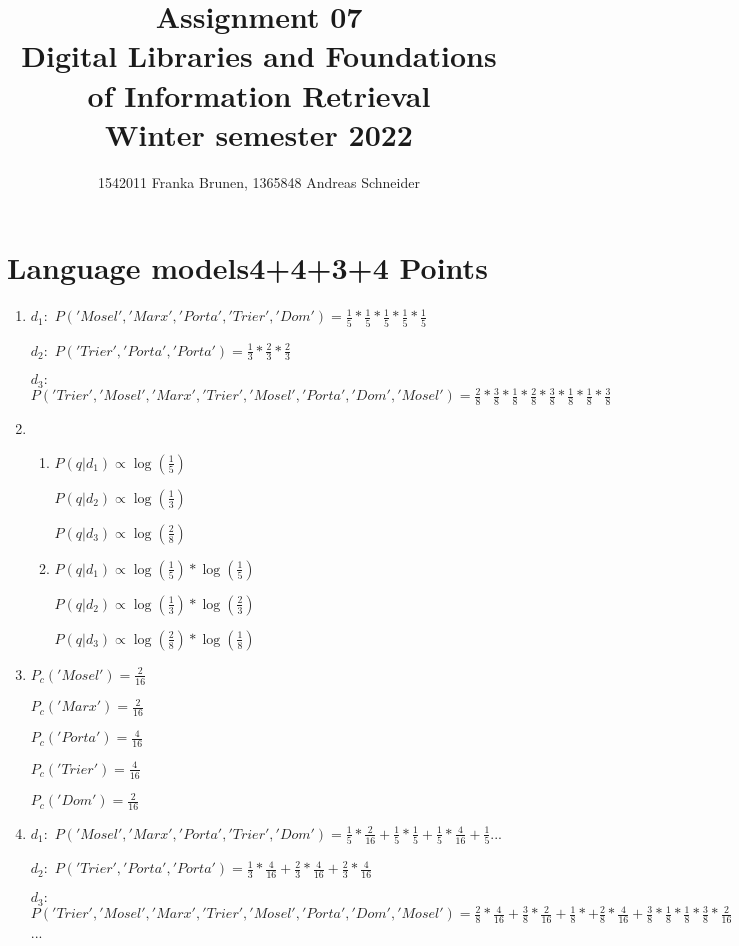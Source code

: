 \documentclass[10pt,a4paper]{article}
\title{ \vspace{-3em}
        Assignment 07\\
		\small{\bf Digital Libraries and Foundations of Information Retrieval}\\
		\small{Winter semester 2022}}
\author{\small{1542011 Franka Brunen}, \small{1365848 Andreas Schneider}}
\date{}
\begin{document}
\setlength{\parskip}{6pt} %
\setlength{\parindent}{0pt}

\leftskip=1cm\rightskip=0.5cm %

\maketitle

\section{\hfill Language models\hfill 4+4+3+4 Points}
\begin{enumerate}
    \item $d_1:$ $P('Mosel', 'Marx', 'Porta', 'Trier', 'Dom') = \frac{1}{5} * \frac{1}{5} * \frac{1}{5} * \frac{1}{5} * \frac{1}{5}$
    
    $d_2:$ $P('Trier', 'Porta', 'Porta') = \frac{1}{3} * \frac{2}{3} * \frac{2}{3}$
    
    $d_3:$ $P('Trier', 'Mosel', 'Marx', 'Trier', 'Mosel', 'Porta', 'Dom', 'Mosel') = \frac{2}{8} * \frac{3}{8} * \frac{1}{8} * \frac{2}{8} * \frac{3}{8} * \frac{1}{8} * \frac{1}{8} * \frac{3}{8}$
    \item \begin{enumerate}
        \item $P(q|d_1) \propto \log(\frac{1}{5})$
        
        $P(q|d_2) \propto \log(\frac{1}{3})$
        
        $P(q|d_3) \propto \log(\frac{2}{8})$
        \item $P(q|d_1) \propto \log(\frac{1}{5}) * \log(\frac{1}{5})$
        
        $P(q|d_2) \propto \log(\frac{1}{3}) * \log(\frac{2}{3})$
        
        $P(q|d_3) \propto \log(\frac{2}{8}) * \log(\frac{1}{8})$
    \end{enumerate}
    \item $P_c('Mosel') = \frac{2}{16}$
    
    $P_c('Marx') = \frac{2}{16}$
    
    $P_c('Porta') = \frac{4}{16}$
    
    $P_c('Trier') = \frac{4}{16}$
    
    $P_c('Dom') = \frac{2}{16}$
    \item $d_1:$ $P('Mosel', 'Marx', 'Porta', 'Trier', 'Dom') = \frac{1}{5} * \frac{2}{16} + \frac{1}{5} * \frac{1}{5} + \frac{1}{5}*\frac{4}{16} + \frac{1}{5}$...
    
    $d_2:$ $P('Trier', 'Porta', 'Porta') = \frac{1}{3} * \frac{4}{16} + \frac{2}{3} * \frac{4}{16} + \frac{2}{3} * \frac{4}{16}$
    
    $d_3:$ $P('Trier', 'Mosel', 'Marx', 'Trier', 'Mosel', 'Porta', 'Dom', 'Mosel') = \frac{2}{8} * \frac{4}{16} + \frac{3}{8} * \frac{2}{16} + \frac{1}{8} * + \frac{2}{8} * \frac{4}{16} + \frac{3}{8} * \frac{1}{8} * \frac{1}{8} * \frac{3}{8} * \frac{2}{16}$...
\end{enumerate}
\end{document}
